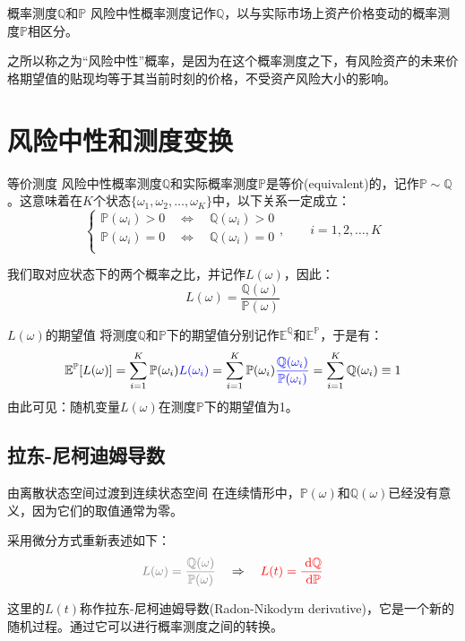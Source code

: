 \documentclass[t]{beamer}
\newcommand{\dif}{{\;\rm d}}
\newcommand{\E}{\mathbb{E}}
\begin{document}
\begin{frame}{概率测度$\mathbb{Q}$和$\mathbb{P}$}
风险中性概率测度记作$\mathbb{Q}$，以与实际市场上资产价格变动的概率测度$\mathbb{P}$相区分。

之所以称之为“风险中性”概率，是因为在这个概率测度之下，有风险资产的未来价格期望值的贴现均等于其当前时刻的价格，不受资产风险大小的影响。
\end{frame}


\section{风险中性和测度变换}
\begin{frame}{等价测度}
风险中性概率测度$\mathbb{Q}$和实际概率测度$\mathbb{P}$是等价(equivalent)的，记作$\mathbb{P}\sim \mathbb{Q}$。这意味着在$K$个状态$\{\omega_1,\omega_2,\ldots,\omega_K\}$中，以下关系一定成立：
\begin{equation*}
\begin{cases}
\mathbb{P}(\omega_i) >0 \quad  \Longleftrightarrow \quad\mathbb{Q}(\omega_i) >0 \\
\mathbb{P}(\omega_i) =0  \quad\Longleftrightarrow \quad\mathbb{Q}(\omega_i) =0 \\
\end{cases}
,\qquad i=1,2,\ldots,K
\end{equation*}

我们取对应状态下的两个概率之比，并记作$L(\omega)$，因此：
\begin{equation*}
L(\omega)=\frac{\mathbb{Q}(\omega)}{\mathbb{P}(\omega)}
\end{equation*}
\end{frame}

\begin{frame}{$L(\omega)$的期望值}
将测度$\mathbb{Q}$和$\mathbb{P}$下的期望值分别记作$\E^{\mathbb{Q}}$和$\E^{\mathbb{P}}$，于是有：
\begin{equation*}
\E^{\mathbb{P}} [L(\omega)]=\sum^K_{i=1} \mathbb{P}(\omega_i) {\color{blue}L(\omega_i)}=\sum^K_{i=1} \mathbb{P}(\omega_i) {\color{blue}\frac{\mathbb{Q}(\omega_i)}{\mathbb{P}(\omega_i)}}=\sum^K_{i=1}\mathbb{Q}(\omega_i)\equiv 1
\end{equation*}
由此可见：随机变量$L(\omega)$在{\color{red}测度$\mathbb{P}$下}的期望值为1。
\end{frame}


\subsection{拉东-尼柯迪姆导数}
\begin{frame}{由离散状态空间过渡到连续状态空间}
在连续情形中，$\mathbb{P}(\omega)$和$\mathbb{Q}(\omega)$已经没有意义，因为它们的取值通常为零。

采用微分方式重新表述如下：
\begin{equation*}
{\color{gray}L(\omega)=\frac{\mathbb{Q}(\omega)}{\mathbb{P}(\omega)}}\quad \Rightarrow \quad {\color{red}L(t)=\frac{\dif\mathbb{Q}}{\dif \mathbb{P}}}
\end{equation*}

这里的$L(t)$称作拉东-尼柯迪姆导数(Radon-Nikodym derivative)，它是一个新的随机过程。通过它可以进行概率测度之间的转换。
\end{frame}
\end{document}
